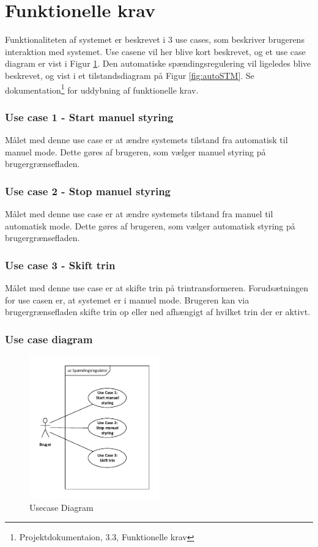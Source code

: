 
\section{Funktionelle krav}

Funktionaliteten af systemet er beskrevet i 3 use cases, som beskriver brugerens interaktion med systemet. Use casene vil her blive kort beskrevet, og et use case diagram er vist i Figur \ref{fig:UsecaseDiagram}.
 Den automatiske spændingsregulering vil ligeledes blive beskrevet, og vist i et tilstandsdiagram på Figur \ref{fig:autoSTM}.
  Se dokumentation\footnote{Projektdokumentaion, 3.3, Funktionelle krav} for uddybning af funktionelle krav. 

\subsubsection{Use case 1 - Start manuel styring}
Målet med denne use case er at ændre systemets tilstand fra automatisk til manuel mode. Dette gøres af brugeren, som vælger manuel styring på brugergrænsefladen. 

\subsubsection{Use case 2 - Stop manuel styring}
Målet med denne use case er at ændre systemets tilstand fra manuel til automatisk mode. Dette gøres af brugeren, som vælger automatisk styring på brugergrænsefladen. 

\subsubsection{Use case 3 - Skift trin}
Målet med denne use case er at skifte trin på trintransformeren. Forudsætningen for use casen er, at systemet er i manuel mode. Brugeren kan via brugergrænsefladen skifte trin op eller ned afhængigt af hvilket trin der er aktivt. 

\subsubsection{Use case diagram}
\begin{figure}[H] %
	\centering
	\includegraphics[width=0.5\textwidth]{figure/UsecaseDiagram}
	\caption{Usecase Diagram}
	\label{fig:UsecaseDiagram}
\end{figure}

